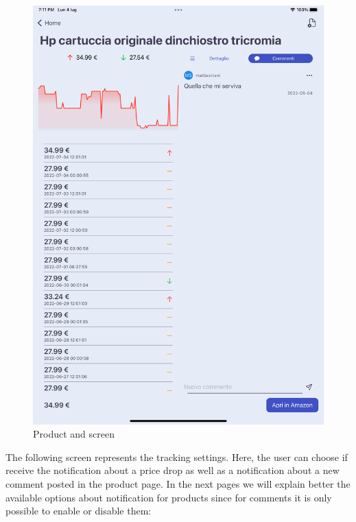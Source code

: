 \begin{figure}[h!]
        \centering
        \includegraphics[scale=0.15]{images/interfaces/product_and_comment_ipad.png}
        \caption{Product and screen}
        \label{fig:product_and_comment_ipad}
\end{figure}
\FloatBarrier


The following screen represents the tracking settings. Here, the user can choose if receive the notification about a price drop as well as a notification about a new comment posted in the product page. In the next pages we will explain better the available options about notification for products since for comments it is only possible to enable or disable them:




